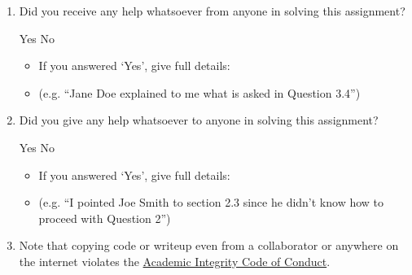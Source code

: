 \documentclass[11pt,addpoints,answers]{exam}
\numberwithin{equation}{section} %
\numberwithin{figure}{section} %
\numberwithin{table}{section} %
\begin{document}
\begin{enumerate}
    \item Did you receive any help whatsoever from anyone in solving this assignment?
    \begin{checkboxes}
     \choice Yes
     \choice No
    \end{checkboxes}
    \begin{itemize}
        \item If you answered `Yes', give full details:
        \item (e.g. “Jane Doe explained to me what is asked in Question 3.4”)
    \end{itemize}

    \begin{tcolorbox}[fit,height=3cm,blank, borderline={1pt}{-2pt},nobeforeafter]
    \end{tcolorbox}

    \item Did you give any help whatsoever to anyone in solving this assignment?
    \begin{checkboxes}
     \choice Yes
     \choice No\
    \end{checkboxes}
    \begin{itemize}
        \item If you answered `Yes', give full details:
        \item (e.g. “I pointed Joe Smith to section 2.3 since he didn’t know how to proceed with Question 2”)
    \end{itemize}

    \begin{tcolorbox}[fit,height=3cm,blank, borderline={1pt}{-2pt},nobeforeafter]
    \end{tcolorbox}

    \item Note that copying code or writeup even from a collaborator or anywhere on the internet violates the \href{hhttps://www.cmu.edu/policies/student-and-student-life/academic-integrity.html}{Academic Integrity Code of Conduct}.
\end{enumerate}
\end{document}
